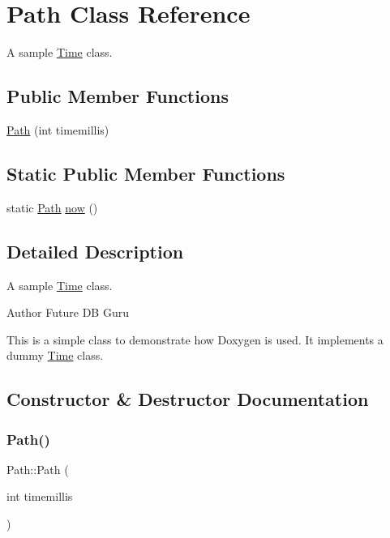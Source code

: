 \hypertarget{classPath}{}\section{Path Class Reference}
\label{classPath}


A sample \hyperlink{classTime}{Time} class.  


\subsection*{Public Member Functions}
\begin{DoxyCompactItemize}
\item 
\hyperlink{classPath_a212baddaf199f3a159d022ebd5ae4ede}{Path} (int timemillis)
\end{DoxyCompactItemize}
\subsection*{Static Public Member Functions}
\begin{DoxyCompactItemize}
\item 
static \hyperlink{classPath}{Path} \hyperlink{classPath_a7e6c6833d0a1e919466d9c30917183fb}{now} ()
\end{DoxyCompactItemize}


\subsection{Detailed Description}
A sample \hyperlink{classTime}{Time} class. 

\begin{DoxyAuthor}{Author}
Future DB Guru
\end{DoxyAuthor}
This is a simple class to demonstrate how Doxygen is used. It implements a dummy \hyperlink{classTime}{Time} class. 

\subsection{Constructor \& Destructor Documentation}
\mbox{\label{classPath_a212baddaf199f3a159d022ebd5ae4ede}} 
\subsubsection{\texorpdfstring{Path()}{Path()}}
{\footnotesize\ttfamily Path\+::\+Path (\begin{DoxyParamCaption}\item[{int}]{timemillis }\end{DoxyParamCaption})\hspace{0.3cm}{\ttfamily [inline]}}

